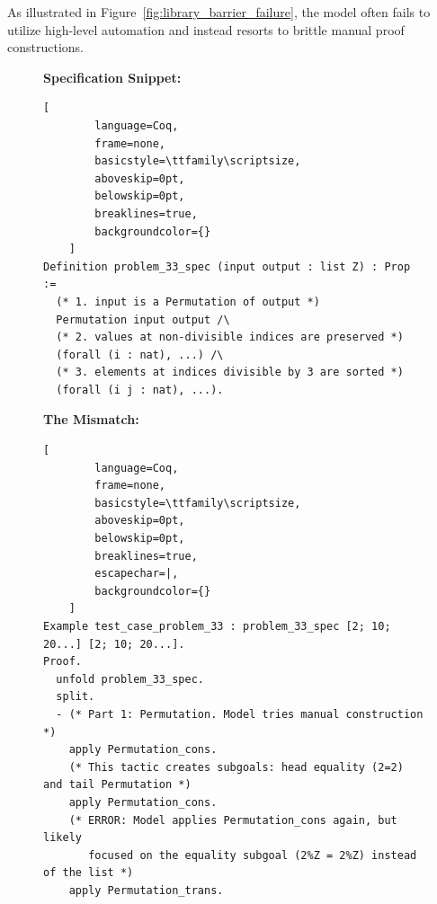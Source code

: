 As illustrated in Figure~\ref{fig:library_barrier_failure}, the model often fails to utilize high-level automation and instead resorts to brittle manual proof constructions.

\begin{figure}[t!]
    \centering
    \begin{tcolorbox}[
        enhanced,
        title=\textbf{Failure Mode 2: Inability to Discharge Library Predicates (HumanEval/33)},
        fonttitle=\bfseries\small,
        colback=blue!3!white,    %
        colframe=blue!50!black,  %
        boxrule=0.8pt,
        arc=2pt,
        before skip=10pt,
        after skip=10pt
    ]
    
    \textbf{Specification Snippet:}
    \vspace{2pt}
    
    \begin{tcolorbox}[
        colback=white,
        colframe=white,
        frame hidden,       %
        boxrule=0pt,
        sharp corners,
        top=3pt, bottom=3pt, left=3pt, right=3pt
    ]
    \begin{lstlisting}[
        language=Coq, 
        frame=none, 
        basicstyle=\ttfamily\scriptsize, 
        aboveskip=0pt,
        belowskip=0pt,
        breaklines=true,
        backgroundcolor={} 
    ]
Definition problem_33_spec (input output : list Z) : Prop :=
  (* 1. input is a Permutation of output *)
  Permutation input output /\
  (* 2. values at non-divisible indices are preserved *)
  (forall (i : nat), ...) /\ 
  (* 3. elements at indices divisible by 3 are sorted *)
  (forall (i j : nat), ...).
    \end{lstlisting}
    \end{tcolorbox}

    \vspace{0.2cm}
    
    \textbf{The Mismatch:}
    \vspace{2pt}
    
    \begin{tcolorbox}[
        colback=white,
        colframe=white,
        frame hidden,
        boxrule=0pt,
        sharp corners,
        top=3pt, bottom=3pt, left=3pt, right=3pt
    ]
    \begin{lstlisting}[
        language=Coq, 
        frame=none, 
        basicstyle=\ttfamily\scriptsize,
        aboveskip=0pt,
        belowskip=0pt,
        breaklines=true,
        escapechar=|,
        backgroundcolor={} 
    ]
Example test_case_problem_33 : problem_33_spec [2; 10; 20...] [2; 10; 20...].
Proof.
  unfold problem_33_spec.
  split.
  - (* Part 1: Permutation. Model tries manual construction *)
    apply Permutation_cons. 
    (* This tactic creates subgoals: head equality (2=2) and tail Permutation *)
    apply Permutation_cons.
    (* ERROR: Model applies Permutation_cons again, but likely 
       focused on the equality subgoal (2%Z = 2%Z) instead of the list *)
    apply Permutation_trans.
    

\end{lstlisting}
\end{tcolorbox}
\end{tcolorbox}
\end{figure}
